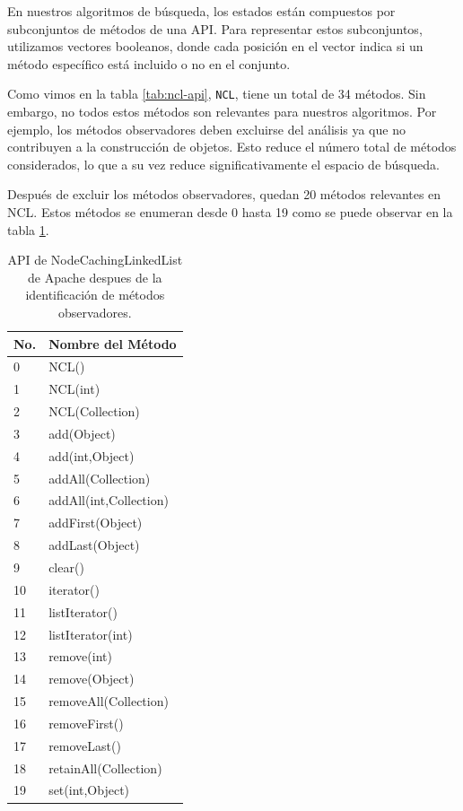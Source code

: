 En nuestros algoritmos de búsqueda, los estados están compuestos por subconjuntos de métodos de una API. Para representar estos subconjuntos, utilizamos vectores booleanos, donde cada posición en el vector indica si un método específico está incluido o no en el conjunto.

Como vimos en la tabla \ref{tab:ncl-api}, \texttt{NCL}, tiene un total de 34 métodos. Sin embargo, no todos estos métodos son relevantes para nuestros algoritmos. Por ejemplo, los métodos observadores deben excluirse del análisis ya que no contribuyen a la construcción de objetos. Esto reduce el número total de métodos considerados, lo que a su vez reduce significativamente el espacio de búsqueda.

Después de excluir los métodos observadores, quedan 20 métodos relevantes en NCL. Estos métodos se enumeran desde 0 hasta 19 como se puede observar en la tabla \ref{tab:ncl-api-infer}. 
\begin{table}[h!]
\centering
{\scriptsize
\begin{tabular}{|l|l|}
\hline
No. & Nombre del Método \\
\hline
0 & NCL() \\
1 & NCL(int) \\
2 & NCL(Collection) \\
3 & add(Object) \\
4 & add(int,Object) \\
5 & addAll(Collection) \\
6 & addAll(int,Collection) \\
7 & addFirst(Object) \\
8 & addLast(Object) \\
9 & clear() \\
10 & iterator() \\
11 & listIterator() \\
12 & listIterator(int) \\
13 & remove(int) \\
14 & remove(Object) \\
15 & removeAll(Collection) \\
16 & removeFirst() \\
17 & removeLast() \\
18 & retainAll(Collection) \\
19 & set(int,Object) \\
\hline
\end{tabular}
}
\caption{API de NodeCachingLinkedList de Apache despues de la identificación de métodos observadores.}
\label{tab:ncl-api-infer}
\end{table}

